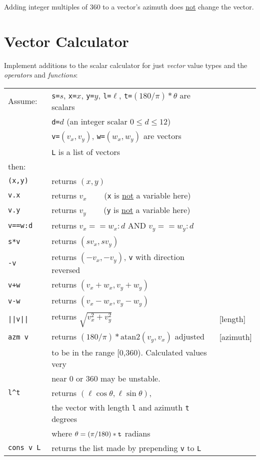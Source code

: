 \documentclass[12pt]{article}
\begin{document}
Adding integer multiples of 360 to a vector's
azimuth does \underline{not} change the vector.

\newpage

\section{Vector Calculator}
Implement additions to the scalar calculator for just {\em vector}
value types and the {\em operators} and {\em functions}:
\begin{center}
\begin{tabular}{l@{~~~~~}l@{~~~~~}l}
Assume: & {\tt s=}$s$, {\tt x=}$x$, {\tt y=$y$},
          {\tt l=$\ell$}, {\tt t=$(180/\pi)*\theta$}
          are scalars \\
	& {\tt d=}$d$ (an integer scalar $0\le d\le 12$) \\
	& {\tt v=}$(v_x,v_y)$, {\tt w=}$(w_x,w_y)$ are vectors \\
	& {\tt L} is a list of vectors \\
then: \\[1ex]
\tt (x,y) & returns $(x,y)$ \\
\tt v.x & returns $v_x$ ~~~ ({\tt x} is \underline{not} a variable here) \\
\tt v.y & returns $v_y$ ~~~ ({\tt y} is \underline{not} a variable here) \\
\tt v==w:d & returns $v_x==w_x:d$ AND $v_y==w_y:d$ \\
\tt s*v & returns $(s v_x, s v_y )$ \\
\tt -v & returns $( -v_x, -v_y )$, {\tt v} with direction reversed \\
\tt v+w & returns $(v_x + w_x, v_y + w_y)$ \\
\tt v-w & returns $(v_x - w_x, v_y - w_y)$ \\
\tt ||v|| & returns $\sqrt{v_x^2 + v_y^2}$ & [length] \\
\tt azm v & returns $(180/\pi)*\mathrm{atan2}(v_y,v_x)$ adjusted & [azimuth] \\
          & to be in the range [0,360).  Calculated values very \\
	  & near 0 or 360 may be unstable. \\
\tt l\textasciicircum t
          & returns $(\ell\cos\theta,\ell\sin\theta)$, \\
	  & the vector with length {\tt l} and azimuth {\tt t} degrees \\
	  & where $\theta = (\pi/180)*{\tt t}$ radians \\
\tt cons v L & returns the list made by prepending {\tt v} to {\tt L} \\
\end{tabular}
\end{center}
\end{document}
